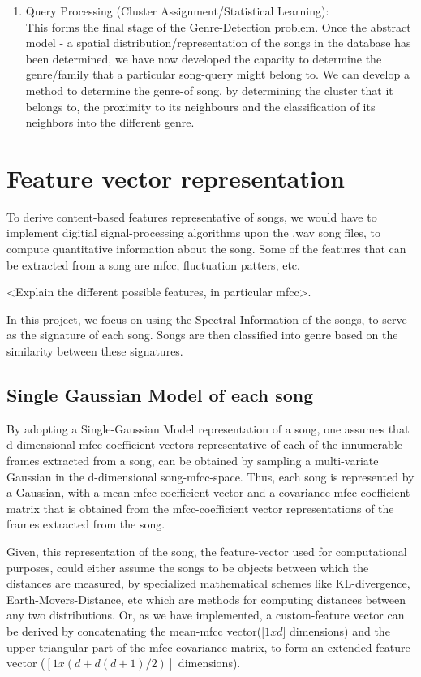 \documentclass[12pt]{article}
\begin{document}
\begin{enumerate}
\item Query Processing (Cluster Assignment/Statistical Learning):\\
This forms the final stage of the Genre-Detection problem. Once the abstract model - a spatial distribution/representation of the songs in the database has been determined, we have now developed the capacity to determine the genre/family that a particular song-query might belong to. We can develop a method to determine the genre-of song, by determining the cluster that it belongs to, the proximity to its neighbours and the classification of its neighbors into the different genre. 


\end{enumerate}

\section{Feature vector representation}

To derive content-based features representative of songs, we would have to implement digitial signal-processing algorithms upon the .wav song files, to compute quantitative information about the song. Some of the features that can be extracted from a song are mfcc, fluctuation patters, etc. 

<Explain the different possible features, in particular mfcc>. 

In this project, we focus on using the Spectral Information of the songs, to serve as the signature of each song. Songs are then classified into genre based on the similarity between these signatures. 

\subsection{Single Gaussian Model of each song}

By adopting a Single-Gaussian Model representation of a song, one assumes that d-dimensional mfcc-coefficient vectors representative of each of the innumerable frames extracted from a song, can be obtained by sampling a multi-variate Gaussian in the d-dimensional song-mfcc-space. Thus, each song is represented by a Gaussian, with a mean-mfcc-coefficient vector and a covariance-mfcc-coefficient matrix that is obtained from the mfcc-coefficient vector representations of the frames extracted from the song. 

Given, this representation of the song, the feature-vector used for computational purposes, could either assume the songs to be objects between which the distances are measured, by specialized mathematical schemes like KL-divergence, Earth-Movers-Distance, etc which are methods for computing distances between any two distributions. Or, as we have implemented, a custom-feature vector can be derived by concatenating the mean-mfcc vector($[1xd$] dimensions) and the upper-triangular part of the mfcc-covariance-matrix, to form an extended feature-vector ($[1x (d + d(d+1)/2)]$ dimensions).
\end{document}
